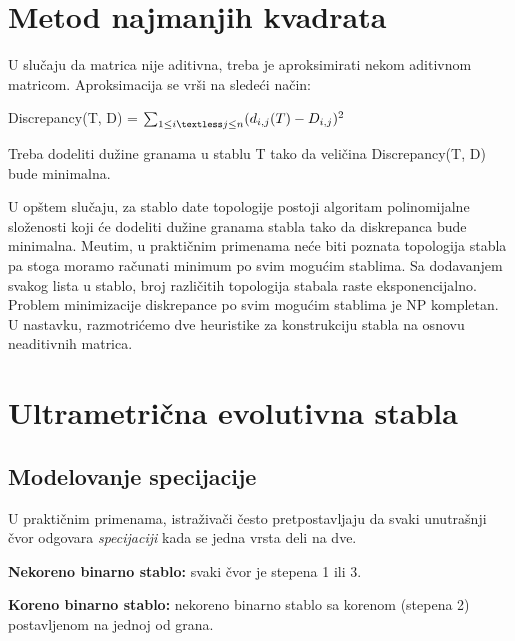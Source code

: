 \section{Metod najmanjih kvadrata}
\label{sec:metodnajmanjihkvadrata}

U slu\v{c}aju da matrica nije aditivna, treba je aproksimirati nekom aditivnom matricom. Aproksimacija se vr\v{s}i na slede\'ci na\v{c}in:

\begin{tcolorbox}
\begin{center}
Discrepancy(T, D) = $\sum_{1 \leq i \textless j \leq n} (d_{i, j}(T) - D_{i, j})^{2}$
\end{center}
\end{tcolorbox}

Treba dodeliti du\v{z}ine granama u stablu T tako da veli\v{c}ina Discrepancy(T, D) bude minimalna.

U op\v{s}tem slu\v{c}aju, za stablo date topologije postoji algoritam polinomijalne slo\v{z}enosti koji \'ce dodeliti du\v{z}ine granama stabla tako da diskrepanca bude minimalna. Me\dj utim, u prakti\v{c}nim primenama ne\'ce biti poznata topologija stabla pa stoga moramo ra\v{c}unati minimum po svim mogu\'cim stablima. Sa dodavanjem svakog lista u stablo, broj razli\v{c}itih topologija stabala raste eksponencijalno. Problem minimizacije diskrepance po svim mogu\'cim stablima je NP kompletan. U nastavku, razmotri\'cemo dve heuristike za konstrukciju stabla na osnovu neaditivnih matrica.

\section{Ultrametri\v{c}na evolutivna stabla}
\label{sec:ues}

\subsection{Modelovanje specijacije}
\label{subsec:ms}

U prakti\v{c}nim primenama, istra\v{z}iva\v{c}i \v{c}esto pretpostavljaju da svaki unutra\v{s}nji \v{c}vor odgovara \textit{specijaciji} kada se jedna vrsta deli na dve.

\begin{definicija}
\textbf{Nekoreno binarno stablo:} svaki \v{c}vor je stepena 1 ili 3.
\end{definicija}

\begin{definicija}
\textbf{Koreno binarno stablo:} nekoreno binarno stablo sa korenom (stepena 2) postavljenom na jednoj od grana.
\end{definicija}

